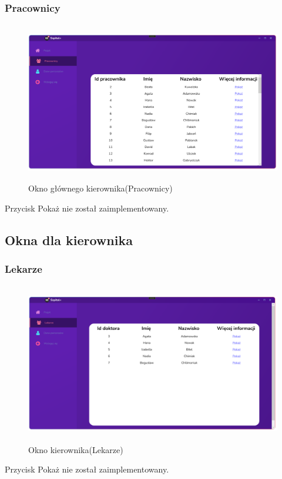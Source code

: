 \begin{flushleft}
    \subsubsection{\large{Pracownicy}}
    \begin{figure}[H]
        \begin{center}
	\includegraphics[height=7cm]{images/gl_kier_prac.png}
        \caption{Okno głównego kierownika(Pracownicy)}
        \label{fig:gl_kier_prac}
	\end{center}
    \end{figure}
    \hspace{5mm}Przycisk \textquotedbl Pokaż\textquotedbl{} nie został zaimplementowany.

    \subsection{\Large{Okna dla kierownika}}
    \subsubsection{\large{Lekarze}}
    \begin{figure}[H]
        \begin{center}
	\includegraphics[height=7cm]{images/kier_lekar.png}
        \caption{Okno kierownika(Lekarze)}
        \label{fig:kier_lekar}
	\end{center}
    \end{figure}
    \hspace{5mm}Przycisk \textquotedbl Pokaż\textquotedbl{} nie został zaimplementowany.


\end{flushleft}
